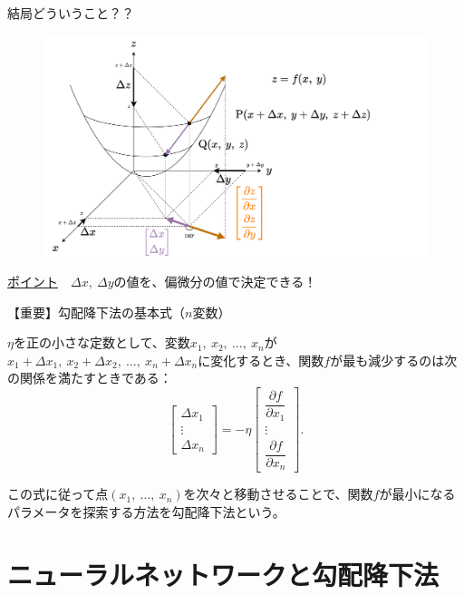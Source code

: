\documentclass[dvipdfmx,aspectratio=169]{beamer}
\begin{document}
	\begin{frame}{結局どういうこと？？}
		\begin{figure}
			\centering
			\includegraphics[width=0.7\linewidth]{img/visualization-of-the-basic-equation-of-the-gradient-descent-method}
		\end{figure}
		\underline{ポイント}　$ \Delta x,\ \Delta y $の値を、偏微分の値で決定できる！
	\end{frame}
	\begin{frame}{【重要】勾配降下法の基本式（$ n $変数）}
		\begin{screen}
			$ \eta $を正の小さな定数として、変数$ x_1,\ x_2,\ \dots,\ x_n $が$ x_1 + \Delta x_1,\ x_2 + \Delta x_2,\ \dots,\ x_n + \Delta x_n $に変化するとき、関数$ f $が最も減少するのは次の関係を満たすときである：
			\begin{equation*}
				\begin{bmatrix}
					\Delta x_1\\
					\vdots\\
					\Delta x_n
				\end{bmatrix} = -\eta \begin{bmatrix}
					\dfrac{\partial f}{\partial x_1}\\
					\vdots\\
					\dfrac{\partial f}{\partial x_n}
				\end{bmatrix}.
			\end{equation*}
		\end{screen}
		この式に従って点$ (x_1,\ \dots,\ x_n) $を次々と移動させることで、関数$ f $が最小になるパラメータを探索する方法を\alert{勾配降下法}という。
	\end{frame}

	\section{ニューラルネットワークと勾配降下法}
\end{document}
